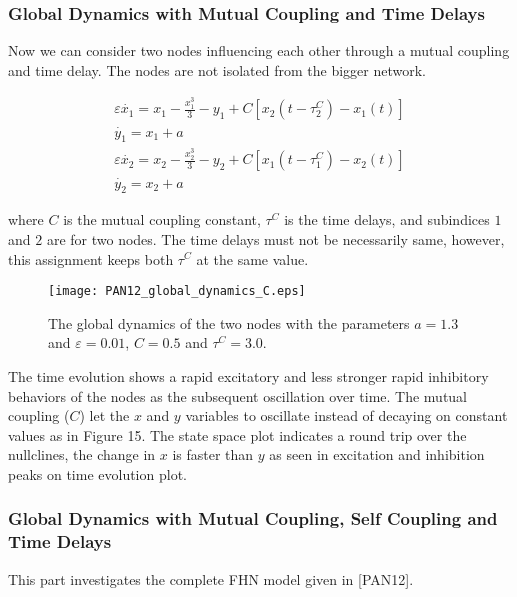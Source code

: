 \documentclass[12pt]{article}
\begin{document}
\subsubsection{Global Dynamics with Mutual Coupling and Time Delays}

Now we can consider two nodes influencing each other through a mutual coupling and time delay. The nodes are not isolated from the bigger network.

\begin{subequations} \begin{align} \varepsilon  \dot{x_1} = x_1 - \frac{x_1^3}{3} -y_1  + C [x_2(t-\tau_2^C)-x_1(t)] \label{eqn: frobenius 10}\\  \dot{y_1} = x_1+a \label{eqn: frobenius 11}  \\ \varepsilon  \dot{x_2} = x_2 - \frac{x_2^3}{3} -y_2  + C [x_1(t-\tau_1^C)-x_2(t)] \label{eqn: frobenius 12}  \\  \dot{y_2} = x_2+a \label{eqn: frobenius 13} 
\end{align} 
\end{subequations}

where $C$ is the mutual coupling constant, $\tau^C$ is the time delays, and subindices $1$ and $2$ are for two nodes. The time delays must not be necessarily same, however, this assignment keeps both $\tau^C$ at the same value.

\begin{figure}[h!]
	\centering
	\texttt{[image: PAN12\_global\_dynamics\_C.eps]}
		\caption{The global dynamics of the two nodes with the parameters $a=1.3$ and $\varepsilon = 0.01$, $C=0.5$ and $\tau^C= 3.0$.}
\end{figure}

 The time evolution shows a rapid excitatory and less stronger rapid inhibitory behaviors of the nodes as the subsequent oscillation over time. The mutual coupling ($C$) let the $x$ and $y$ variables to oscillate instead of decaying on constant values as in Figure 15. The state space plot indicates a round trip over the nullclines, the change in $x$ is faster than $y$ as seen in excitation and inhibition peaks on time evolution plot.
 
\subsubsection{Global Dynamics with Mutual Coupling, Self Coupling and Time Delays}

This part investigates the complete FHN model given in [PAN12].
\end{document}
